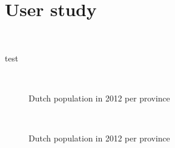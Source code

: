 \documentclass[journal]{vgtc}                %
\begin{document}
\section{User study}~\label{secuser}

test

\begin{figure}[tb]
  \centering
  \mbox{
  }
  \caption{Dutch population in 2012 per province}\label{fig:graphSvy}

\end{figure}

\begin{figure}[tb]
  \centering
  \mbox{
  }
  \caption{Dutch population in 2012 per province}\label{fig:treemapSvy}

\end{figure}
\end{document}
